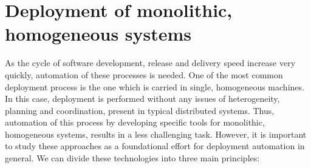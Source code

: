 \section{Deployment of monolithic, homogeneous systems}
\label{subsec:singleDeployment}
As the cycle of software development, release and delivery speed increase very quickly, automation of these processes is needed.
One of the most common deployment process is the one which is carried in single, homogeneous machines.
In this case, deployment is performed without any issues of heterogeneity, planning and coordination, present in typical distributed systems.
Thus, automation of this process by developing specific tools for monolithic, homogeneous systems, results in a less challenging task.
However, it is important to study these approaches as a foundational effort for deployment automation in general.
We can divide these technologies into three main principles:
